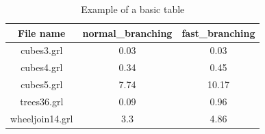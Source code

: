 \documentclass[11pt]{article}
\begin{document}
\begin{table}[h!]
    \centering
    \begin{tabular}{|c|c|c|}
        \hline
        File name & normal\_branching & fast\_branching \\
        \hline
		cubes3.grl & 0.03 & 0.03 \\
		cubes4.grl & 0.34 & 0.45 \\
		cubes5.grl & 7.74 & 10.17 \\
		trees36.grl & 0.09 & 0.96 \\
		wheeljoin14.grl & 3.3 & 4.86 \\
        \hline
    \end{tabular}
    \caption{Example of a basic table}
    \label{tab:1}
\end{table}
\end{document}
